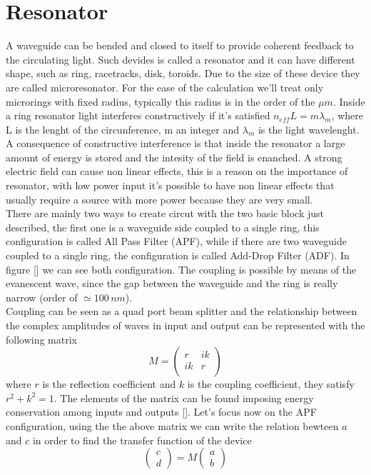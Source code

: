 \documentclass[10pt]{book}
\begin{document}
\section{Resonator}
A waveguide can be bended and closed to itself to provide coherent feedback to the circulating light. Such devides is called a resonator and it can have different shape, such as ring, racetracks, disk, toroids. Due to the size of these device they are called microresonator. For the ease of the calculation we'll treat only microrings with fixed radius, typically this radius is in the order of the $\mu m $. Inside a ring resonator light interferes constructively if it's satisfied $n_{eff} L = m \lambda_m$, where L is the lenght of the circunference, m an integer and $\lambda_m$ is the light wavelenght. A consequence of constructive interference is that inside the resonator a large amount of energy is stored and the intesity of the field is enanched. A strong electric field can cause non linear effects, this is a reason on the importance of resonator, with low power input it's possible to have non linear effects that usually require a source with more power because they are very small. \\
There are mainly two ways to create circut with the two basic block just described, the first one is a waveguide side coupled to a single ring, this configuration is called All Pass Filter (APF), while if there are two waveguide coupled to a single ring, the configuration is called Add-Drop Filter (ADF). In figure [] we can see both configuration. The coupling is possible by means of the evanescent wave, since the gap between the waveguide and the ring is really narrow (order of $\simeq 100\, nm$).\\
Coupling can be seen as a quad port beam splitter and the relationship between the complex amplitudes of waves in input and output can be represented with the following matrix
\[M = \begin{pmatrix}
r & ik \\
ik & r\\
\end{pmatrix}\]
where $r$ is the reflection coefficient and $k$ is the coupling coefficient, they satisfy $r^2 +k^2 = 1$. The elements of the matrix can be found imposing energy conservation among inputs and outputs []. Let's focus now on the APF configuration, using the the above matrix we can write the relation bewteen $a$ and $c$ in order to find the transfer function of the device
\begin{equation}\label{APF}\begin{pmatrix}c \\ d \end{pmatrix} = M \begin{pmatrix}a\\b \end{pmatrix}\end{equation}
\end{document}
